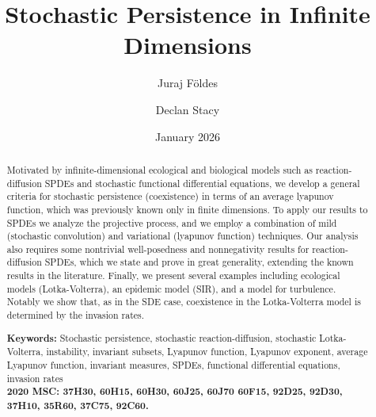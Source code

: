 \documentclass[final]{amsart}
\author[J. F{ö}ldes]{Juraj F{ö}ldes}
\title{Stochastic Persistence in Infinite Dimensions}
\author{Declan Stacy}
\date{January 2026}
\numberwithin{thm}{section}
\numberwithin{equation}{section}
\begin{document}
    

     


     

     

     
     
     

    
   












    
    
     

\begin{abstract}
    Motivated by infinite-dimensional ecological and biological models such as reaction-diffusion SPDEs and stochastic functional differential equations, we develop a general criteria for stochastic persistence (coexistence) in terms of an average lyapunov function, which was previously known only in  finite dimensions. To apply our results to SPDEs we  analyze the projective process, and we employ a combination of mild (stochastic convolution) and variational (lyapunov function) techniques. Our analysis also requires some nontrivial well-posedness and nonnegativity results for reaction-diffusion SPDEs, which we state and prove in great generality, extending the known results in the literature. Finally, we present  several examples including ecological models (Lotka-Volterra), an epidemic model (SIR), and a model for turbulence. Notably we show that, as in the SDE case, coexistence in the Lotka-Volterra model is determined by the invasion rates. 

    \smallskip
\noindent \textbf{Keywords:} Stochastic persistence, stochastic reaction-diffusion, stochastic Lotka-Volterra,  instability, invariant subsets, Lyapunov function, Lyapunov exponent, average Lyapunov function, invariant measures, SPDEs, functional differential equations, invasion rates\\

\noindent
\textbf{2020 MSC: 37H30,  60H15, 60H30,  60J25, 60J70 60F15, 92D25, 92D30, 37H10, 35R60, 37C75, 92C60.} 
\end{abstract}

\maketitle 
\end{document}
